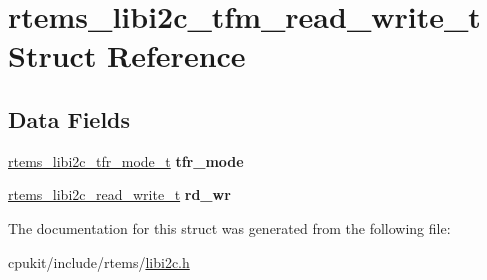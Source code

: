 \hypertarget{structrtems__libi2c__tfm__read__write__t}{}\section{rtems\+\_\+libi2c\+\_\+tfm\+\_\+read\+\_\+write\+\_\+t Struct Reference}
\label{structrtems__libi2c__tfm__read__write__t}
\subsection*{Data Fields}
\begin{DoxyCompactItemize}
\item 
\mbox{\label{structrtems__libi2c__tfm__read__write__t_a3c5c3834fd2a8ef4148a54dfd40fc280}} 
\mbox{\hyperlink{structrtems__libi2c__tfr__mode__t}{rtems\+\_\+libi2c\+\_\+tfr\+\_\+mode\+\_\+t}} {\bfseries tfr\+\_\+mode}
\item 
\mbox{\label{structrtems__libi2c__tfm__read__write__t_ab5d6d00ac1f6d98cf44a03b0dac58a11}} 
\mbox{\hyperlink{structrtems__libi2c__read__write__t}{rtems\+\_\+libi2c\+\_\+read\+\_\+write\+\_\+t}} {\bfseries rd\+\_\+wr}
\end{DoxyCompactItemize}


The documentation for this struct was generated from the following file\+:\begin{DoxyCompactItemize}
\item 
cpukit/include/rtems/\mbox{\hyperlink{libi2c_8h}{libi2c.\+h}}\end{DoxyCompactItemize}
